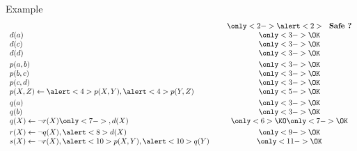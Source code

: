 \begin{frame}[c]{Example}
  \[
  \begin{array}{lcc}
         & \ & \only<2->{\alert<2>{\text{\ \ \textbf{Safe ?}}}}\\
    d(a) & & \only<3->{\OK}\\
    d(c) & & \only<3->{\OK}\\
    d(d) & & \only<3->{\OK}\\[3pt]
    p(a,b) & & \only<3->{\OK}\\
    p(b,c) & & \only<3->{\OK}\\
    p(c,d) & & \only<3->{\OK}\\
    p(X,Z) \leftarrow \alert<4>{p(X,Y)}, \alert<4>{p(Y,Z)} & & \only<5->{\OK}\\[3pt]
    q(a) & & \only<3->{\OK}\\
    q(b) & & \only<3->{\OK}\\
    q(X) \leftarrow \neg r(X)\only<7->{, d(X)} & & \only<6>{\KO}\only<7->{\OK}\\[3pt]
    r(X) \leftarrow \neg q(X), \alert<8>{d(X)} & & \only<9->{\OK}\\
    s(X) \leftarrow \neg r(X), \alert<10>{p(X,Y)}, \alert<10>{q(Y)} & & \only<11->{\OK}\\
  \end{array}
\]
\bigskip
\end{frame}
%
